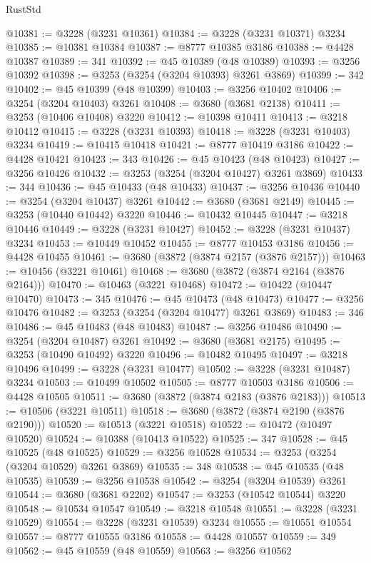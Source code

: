 \begin{lexlean}{RustStd}
\begin{coremodule}
{\begin{coremodule}
{{{{{{{{{{{{{{{{{{{{{{{{{{{{{{{{{{{{{@10381 := @3228 (@3231 @10361)
@10384 := @3228 (@3231 @10371) @3234
@10385 := @10381 @10384
@10387 := @8777 @10385 @3186
@10388 := @4428 @10387
@10389 := 341
@10392 := @45 @10389 (@48 @10389)
@10393 := @3256 @10392
@10398 := @3253 (@3254 (@3204 @10393) @3261 @3869)
@10399 := 342
@10402 := @45 @10399 (@48 @10399)
@10403 := @3256 @10402
@10406 := @3254 (@3204 @10403) @3261
@10408 := @3680 (@3681 @2138)
@10411 := @3253 (@10406 @10408) @3220
@10412 := @10398 @10411
@10413 := @3218 @10412
@10415 := @3228 (@3231 @10393)
@10418 := @3228 (@3231 @10403) @3234
@10419 := @10415 @10418
@10421 := @8777 @10419 @3186
@10422 := @4428 @10421
@10423 := 343
@10426 := @45 @10423 (@48 @10423)
@10427 := @3256 @10426
@10432 := @3253 (@3254 (@3204 @10427) @3261 @3869)
@10433 := 344
@10436 := @45 @10433 (@48 @10433)
@10437 := @3256 @10436
@10440 := @3254 (@3204 @10437) @3261
@10442 := @3680 (@3681 @2149)
@10445 := @3253 (@10440 @10442) @3220
@10446 := @10432 @10445
@10447 := @3218 @10446
@10449 := @3228 (@3231 @10427)
@10452 := @3228 (@3231 @10437) @3234
@10453 := @10449 @10452
@10455 := @8777 @10453 @3186
@10456 := @4428 @10455
@10461 := @3680 (@3872 (@3874 @2157 (@3876 @2157)))
@10463 := @10456 (@3221 @10461)
@10468 := @3680 (@3872 (@3874 @2164 (@3876 @2164)))
@10470 := @10463 (@3221 @10468)
@10472 := @10422 (@10447 @10470)
@10473 := 345
@10476 := @45 @10473 (@48 @10473)
@10477 := @3256 @10476
@10482 := @3253 (@3254 (@3204 @10477) @3261 @3869)
@10483 := 346
@10486 := @45 @10483 (@48 @10483)
@10487 := @3256 @10486
@10490 := @3254 (@3204 @10487) @3261
@10492 := @3680 (@3681 @2175)
@10495 := @3253 (@10490 @10492) @3220
@10496 := @10482 @10495
@10497 := @3218 @10496
@10499 := @3228 (@3231 @10477)
@10502 := @3228 (@3231 @10487) @3234
@10503 := @10499 @10502
@10505 := @8777 @10503 @3186
@10506 := @4428 @10505
@10511 := @3680 (@3872 (@3874 @2183 (@3876 @2183)))
@10513 := @10506 (@3221 @10511)
@10518 := @3680 (@3872 (@3874 @2190 (@3876 @2190)))
@10520 := @10513 (@3221 @10518)
@10522 := @10472 (@10497 @10520)
@10524 := @10388 (@10413 @10522)
@10525 := 347
@10528 := @45 @10525 (@48 @10525)
@10529 := @3256 @10528
@10534 := @3253 (@3254 (@3204 @10529) @3261 @3869)
@10535 := 348
@10538 := @45 @10535 (@48 @10535)
@10539 := @3256 @10538
@10542 := @3254 (@3204 @10539) @3261
@10544 := @3680 (@3681 @2202)
@10547 := @3253 (@10542 @10544) @3220
@10548 := @10534 @10547
@10549 := @3218 @10548
@10551 := @3228 (@3231 @10529)
@10554 := @3228 (@3231 @10539) @3234
@10555 := @10551 @10554
@10557 := @8777 @10555 @3186
@10558 := @4428 @10557
@10559 := 349
@10562 := @45 @10559 (@48 @10559)
@10563 := @3256 @10562
}}}}}}}}}}}}}}}}}}}}}}}}}}}}}}}}}}}}}
\end{coremodule}}
\end{coremodule}
\end{lexlean}
